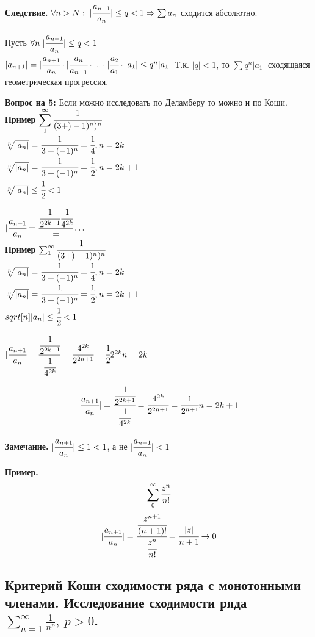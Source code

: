 \documentclass[12pt, a4paper]{article}
\begin{document}
\begin{centering}
\textbf{Следствие.} $\forall n > N:\; |\cfrac{a_{n+1}}{a_n}| \leq q < 1 \Rightarrow \sum a_n$ сходится абсолютно.

\begin{tcolorbox}[title=Доказательство следствия]
	Пусть $ \forall n\; |\cfrac{a_{n+1}}{a_n}| \leq q < 1 $\\
$ |a_{n+1}| = |\cfrac{a_{n+1}}{a_n} \cdot |\cfrac{a_{n}}{a_{n-1}} \cdot ... \cdot |\cfrac{a_{2}}{a_1} \cdot |a_1| \leq q^n |a_1|$ Т.к. $|q| < 1$, то $\displaystyle\sum_{}^{} q^n|a_1|$ сходящаяся геометрическая прогрессия.
\end{tcolorbox}
\textbf{Вопрос на 5:} Если можно исследовать по Деламберу то можно и по Коши.\\

\textbf{Пример}
	$\displaystyle\sum_{1}^{\infty} \cfrac{1}{(3+)-1)^n)^n}$\\
	$\sqrt[n]{|a_n|} = \cfrac{1}{3+(-1)^n} = \cfrac{1}{4}, n = 2k$\\
	$\sqrt[n]{|a_n|} = \cfrac{1}{3+(-1)^n} = \cfrac{1}{2}, n = 2k+1$\\
	$\sqrt[n]{|a_n|} \leq \cfrac{1}{2} < 1$

	$|\cfrac{a_{n+1}}{a_{n}} = \cfrac{\cfrac{1}{2^{2k+1}}{\cfrac{1}{4^{2k}}}} = \dots$\\
\textbf{Пример} 
    $\sum_{1}^{\infty} \cfrac{1}{(3+)-1)^n)^n}$\\
	$\sqrt[n]{|a_n|} = \cfrac{1}{3+(-1)^n} = \cfrac{1}{4}, n = 2k$\\
	$\sqrt[n]{|a_n|} = \cfrac{1}{3+(-1)^n} = \cfrac{1}{2}, n = 2k+1$\\
	$sqrt[n]{|a_n|} \leq \cfrac{1}{2} < 1$

$
	|\cfrac{a_{n+1}}{a_{n}} = \cfrac{\cfrac{1}{2^{2k+1}}}{\cfrac{1}{4^{2k}}} = \cfrac{4^{2k}}{2^{2n+1}} = \cfrac{1}{2}2^{2k}
    n = 2k
$

\[
	|\cfrac{a_{n+1}}{a_{n}}| = \cfrac{\cfrac{1}{2^{2k+1}}}{\cfrac{1}{4^{2k}}} = \cfrac{4^{2k}}{2^{2n+1}} = \cfrac{1}{2^{n+1}}\\
    n = 2k+1
\]

\textbf{Замечание.} $|\cfrac{a_{n+1}}{a_n}| \leq 1 < 1$, а не $|\cfrac{a_{n+1}}{a_n}| < 1$

\textbf{Пример.} \[ \sum_0^\infty \cfrac{z^n}{n!} \]
\[ |\cfrac{a_{n+1}}{a_n}| = \cfrac{\cfrac{z^{n+1}}{(n+1)!}}{\cfrac{z^n}{n!}} = \cfrac{|z|}{n+1} \to 0 \]

\subsection{Критерий Коши сходимости ряда с монотонными членами. Исследование сходимости ряда $ \sum_{n = 1}^{\infty} \frac{1}{n^p},\ p > 0 $.}


\end{centering}
\end{document}
